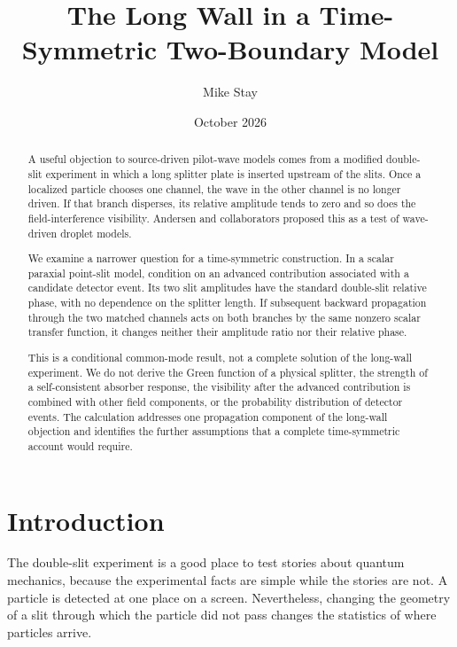 \documentclass[11pt]{article}
\title{The Long Wall in a Time-Symmetric Two-Boundary Model}
\author{Mike Stay}
\date{October 2026}
\begin{document}
\maketitle

\begin{abstract}
A useful objection to source-driven pilot-wave models comes from a modified double-slit experiment in which a long splitter plate is inserted upstream of the slits.  Once a localized particle chooses one channel, the wave in the other channel is no longer driven.  If that branch disperses, its relative amplitude tends to zero and so does the field-interference visibility.  Andersen and collaborators proposed this as a test of wave-driven droplet models.

We examine a narrower question for a time-symmetric construction.  In a scalar paraxial point-slit model, condition on an advanced contribution associated with a candidate detector event.  Its two slit amplitudes have the standard double-slit relative phase, with no dependence on the splitter length.  If subsequent backward propagation through the two matched channels acts on both branches by the same nonzero scalar transfer function, it changes neither their amplitude ratio nor their relative phase.

This is a conditional common-mode result, not a complete solution of the long-wall experiment.  We do not derive the Green function of a physical splitter, the strength of a self-consistent absorber response, the visibility after the advanced contribution is combined with other field components, or the probability distribution of detector events.  The calculation addresses one propagation component of the long-wall objection and identifies the further assumptions that a complete time-symmetric account would require.
\end{abstract}

\section{Introduction}

The double-slit experiment is a good place to test stories about quantum mechanics, because the experimental facts are simple while the stories are not.  A particle is detected at one place on a screen.  Nevertheless, changing the geometry of a slit through which the particle did not pass changes the statistics of where particles arrive.
\end{document}
